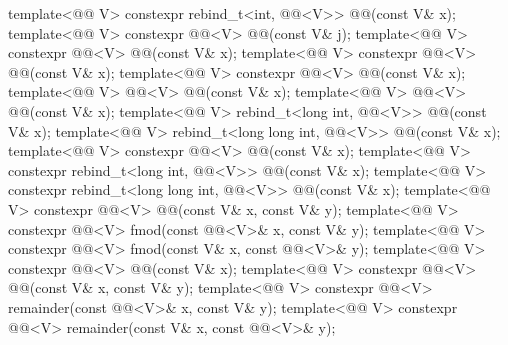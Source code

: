 \begin{itemdecl}
template<@@ V>
  constexpr rebind_t<int, @@<V>> @@(const V& x);
template<@@ V>
  constexpr @@<V> @@(const V& j);
template<@@ V>
  constexpr @@<V> @@(const V& x);
template<@@ V>
  constexpr @@<V> @@(const V& x);
template<@@ V>
  constexpr @@<V> @@(const V& x);
template<@@ V>
  @@<V> @@(const V& x);
template<@@ V>
  @@<V> @@(const V& x);
template<@@ V>
  rebind_t<long int, @@<V>> @@(const V& x);
template<@@ V>
  rebind_t<long long int, @@<V>> @@(const V& x);
template<@@ V>
  constexpr @@<V> @@(const V& x);
template<@@ V>
  constexpr rebind_t<long int, @@<V>> @@(const V& x);
template<@@ V>
  constexpr rebind_t<long long int, @@<V>> @@(const V& x);
template<@@ V>
  constexpr @@<V> @@(const V& x, const V& y);
template<@@ V>
  constexpr @@<V> fmod(const @@<V>& x, const V& y);
template<@@ V>
  constexpr @@<V> fmod(const V& x, const @@<V>& y);
template<@@ V>
  constexpr @@<V> @@(const V& x);
template<@@ V>
  constexpr @@<V> @@(const V& x, const V& y);
template<@@ V>
  constexpr @@<V> remainder(const @@<V>& x, const V& y);
template<@@ V>
  constexpr @@<V> remainder(const V& x, const @@<V>& y);

\end{itemdecl}
